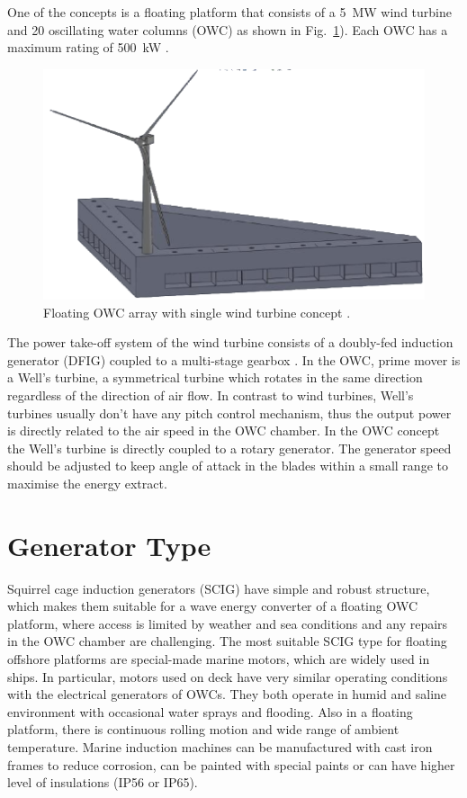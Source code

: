 \documentclass[twocolumn]{article}
\begin{document}
One of the concepts is a floating platform that consists of a 5~MW wind turbine and 20 oscillating water columns (OWC) as shown in Fig.~\ref{owc_array}). Each OWC has a maximum rating of 500~kW \cite{Sullivan2013}.

  \begin{figure}
    \centering
    \includegraphics[]{owc_array}
    \caption{Floating OWC array with single wind turbine concept \cite{Sullivan2013}.} 
    \label{owc_array}
  \end{figure}

The power take-off system of the wind turbine consists of a doubly-fed induction generator (DFIG) coupled to a multi-stage gearbox \cite{Jonkman2009}. In the OWC, prime mover is a Well's turbine, a symmetrical turbine which rotates in the same direction regardless of the direction of air flow. In contrast to wind turbines, Well's turbines usually don't have any pitch control mechanism, thus the output power is directly related to the air speed in the OWC chamber. In the OWC concept the Well's turbine is directly coupled to a rotary generator. The generator speed should be adjusted to keep angle of attack in the blades within a small range to maximise the energy extract.


\section{Generator Type}

Squirrel cage induction generators (SCIG) have simple and robust structure, which makes them suitable for a wave energy converter of a floating OWC platform, where access is limited by weather and sea conditions and any repairs in the OWC chamber are challenging. 
The most suitable SCIG type for floating offshore platforms are special-made marine motors, which are widely used in ships. In particular, motors used on deck have very similar operating conditions with the electrical generators of OWCs. They both operate in humid and saline environment with occasional water sprays and flooding. Also in a floating platform, there is continuous rolling motion and wide range of ambient temperature. Marine induction machines can be manufactured  with cast iron frames to reduce corrosion, can be painted with special paints or can have higher level of insulations (IP56 or IP65).
\end{document}
